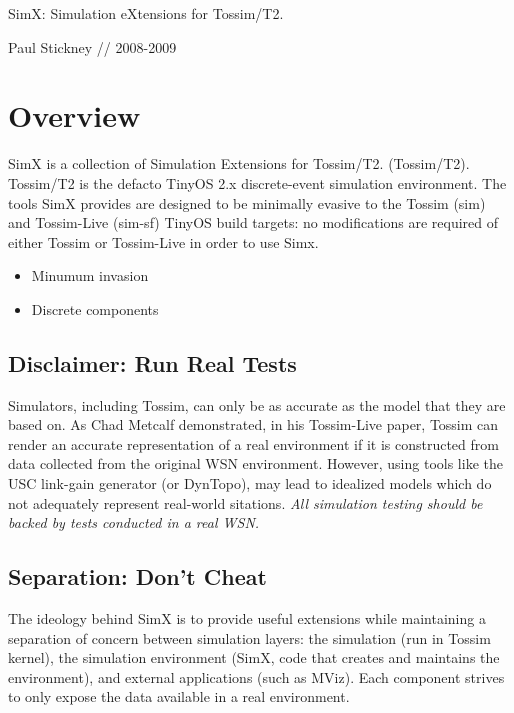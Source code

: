 

\begin{titlepage}
SimX: Simulation eXtensions for Tossim/T2.

Paul Stickney // 2008-2009

\end{titlepage}

\section{Overview}

SimX is a collection of Simulation Extensions for Tossim/T2.
(Tossim/T2). Tossim/T2 is the defacto TinyOS 2.x discrete-event
simulation environment. The tools SimX provides are designed to be
minimally evasive to the Tossim (sim) and Tossim-Live (sim-sf) TinyOS
build targets: no modifications are required of either Tossim or
Tossim-Live in order to use Simx.

\begin{itemize}
\item Minumum invasion
\item Discrete components
\end{itemize}

\subsection{Disclaimer: Run Real Tests}

Simulators, including Tossim, can only be as accurate as the model
that they are based on. As Chad Metcalf demonstrated, in his
Tossim-Live paper, Tossim can render an accurate representation of a
real environment if it is constructed from data collected from the
original WSN environment. However, using tools like the USC link-gain
generator (or DynTopo), may lead to idealized models which do not
adequately represent real-world sitations. {\em All simulation testing
  should be backed by tests conducted in a real WSN.}

\subsection{Separation: Don't Cheat}

The ideology behind SimX is to provide useful extensions while
maintaining a separation of concern between simulation layers: the
simulation (run in Tossim kernel), the simulation environment (SimX,
code that creates and maintains the environment), and external
applications (such as MViz). Each component strives to only expose the
data available in a real environment.

